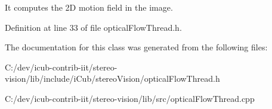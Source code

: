 It computes the 2D motion field in the image. 

Definition at line 33 of file optical\+Flow\+Thread.\+h.



The documentation for this class was generated from the following files\+:\begin{DoxyCompactItemize}
\item 
C\+:/dev/icub-\/contrib-\/iit/stereo-\/vision/lib/include/i\+Cub/stereo\+Vision/optical\+Flow\+Thread.\+h\item 
C\+:/dev/icub-\/contrib-\/iit/stereo-\/vision/lib/src/optical\+Flow\+Thread.\+cpp\end{DoxyCompactItemize}

